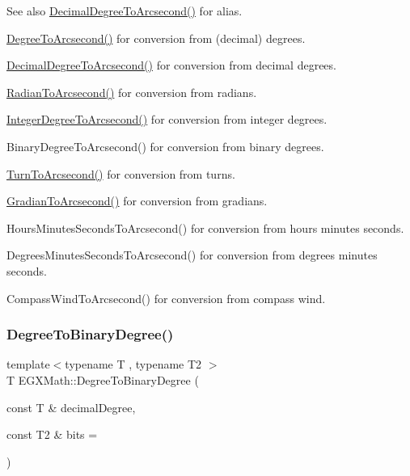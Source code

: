 \begin{DoxySeeAlso}{See also}
\mbox{\hyperlink{group___e_g_x_math-_angle_conversions-_decimal_degree_gab9d5635a6e35127b5245978aba508962}{Decimal\+Degree\+To\+Arcsecond()}} for alias. 

\mbox{\hyperlink{group___e_g_x_math-_angle_conversions-_degree_gaf85e2d765c248f447854a807a68a5de8}{Degree\+To\+Arcsecond()}} for conversion from (decimal) degrees. 

\mbox{\hyperlink{group___e_g_x_math-_angle_conversions-_decimal_degree_gab9d5635a6e35127b5245978aba508962}{Decimal\+Degree\+To\+Arcsecond()}} for conversion from decimal degrees. 

\mbox{\hyperlink{group___e_g_x_math-_angle_conversions-_radian_ga2f952f6675a0fc54bf72bfe4e3d2664a}{Radian\+To\+Arcsecond()}} for conversion from radians. 

\mbox{\hyperlink{group___e_g_x_math-_angle_conversions-_integer_degree_gaa04058a2fea3dc3678264a05fac6e1ae}{Integer\+Degree\+To\+Arcsecond()}} for conversion from integer degrees. 

Binary\+Degree\+To\+Arcsecond() for conversion from binary degrees. 

\mbox{\hyperlink{group___e_g_x_math-_angle_conversions-_turn_gaad072969abc59ef6f5b63ac6a176a11b}{Turn\+To\+Arcsecond()}} for conversion from turns. 

\mbox{\hyperlink{group___e_g_x_math-_angle_conversions-_gradian_gac768fd444195264165d332f2f5e84d92}{Gradian\+To\+Arcsecond()}} for conversion from gradians. 

Hours\+Minutes\+Seconds\+To\+Arcsecond() for conversion from hours minutes seconds. 

Degrees\+Minutes\+Seconds\+To\+Arcsecond() for conversion from degrees minutes seconds. 

Compass\+Wind\+To\+Arcsecond() for conversion from compass wind. 
\end{DoxySeeAlso}
\mbox{\label{group___e_g_x_math-_angle_conversions-_degree_gacd1e3dc5194e89426a899a7cac4874f8}} 
\subsubsection{\texorpdfstring{Degree\+To\+Binary\+Degree()}{DegreeToBinaryDegree()}}
{\footnotesize\ttfamily template$<$typename T , typename T2 $>$ \\
T E\+G\+X\+Math\+::\+Degree\+To\+Binary\+Degree (\begin{DoxyParamCaption}\item[{const T \&}]{decimal\+Degree,  }\item[{const T2 \&}]{bits = {} }\end{DoxyParamCaption})}



